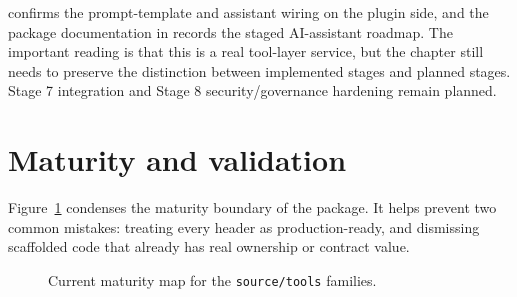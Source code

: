  confirms the prompt-template and assistant wiring on the plugin side, and the package documentation in  records the staged AI-assistant roadmap. The important reading is that this is a real tool-layer service, but the chapter still needs to preserve the distinction between implemented stages and planned stages. Stage 7 integration and Stage 8 security/governance hardening remain planned.

\section{Maturity and validation}
\label{sec:tools-maturity-validation}

Figure~\ref{fig:tools-maturity-map} condenses the maturity boundary of the package. It helps prevent two common mistakes: treating every header as production-ready, and dismissing scaffolded code that already has real ownership or contract value.

\begin{figure}[htbp]
\centering
{}
\caption{Current maturity map for the \texttt{source/tools} families.}
\label{fig:tools-maturity-map}
\end{figure}

